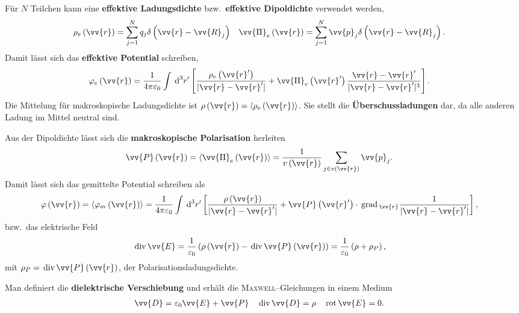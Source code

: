 \documentclass[a4paper,12pt]{article}
\newcommand{\td}{\,\text{d}}
\numberwithin{equation}{section}
\begin{document}
Für $N$ Teilchen kann eine \textbf{effektive Ladungsdichte} bzw.\ \textbf{effektive Dipoldichte} verwendet werden,
\begin{align} 
        \rho _e\left(\vv{r}\right)&=\sum_{j=1}^{N}q_j\delta \left(\vv{r}-\vv{R}_j\right)&\vv{\Pi }_e\left(\vv{r}\right)&=\sum_{j=1}^{N}\vv{p}_j\delta \left(\vv{r}-\vv{R}_j\right)
.\end{align} 
Damit lässt sich das \textbf{effektive Potential} schreiben,
\begin{align} 
        \varphi _e\left(\vv{r}\right)&=\dfrac{1}{4\pi \varepsilon _0}\int_{}^{}\td ^3r'\left[\dfrac{\rho _e\left(\vv{r}'\right)}{|\vv{r}-\vv{r}'|}+\vv{\Pi }_e\left(\vv{r}'\right)\dfrac{\vv{r}-\vv{r}'}{|\vv{r}-\vv{r}'|^3}\right]
.\end{align} 
Die Mittelung für makroskopische Ladungsdichte ist $\rho \left(\vv{r}\right)=\left\langle \rho _e\left(\vv{r}\right)\right\rangle $.
Sie stellt die \textbf{Überschussladungen} dar, da alle anderen Ladung im Mittel neutral sind.\par
Aus der Dipoldichte lässt sich die \textbf{makroskopische Polarisation} herleiten
\begin{align} 
        \vv{P}\left(\vv{r}\right)&=\left\langle \vv{\Pi }_e\left(\vv{r}\right)\right\rangle =\dfrac{1}{v\left(\vv{r}\right)}\sum\limits_{j \in v\left(\vv{r}\right)}^{}\vv{p}_j
.\end{align} 
Damit lässt sich das gemittelte Potential schreiben als
\begin{align} 
        \varphi \left(\vv{r}\right)=\left\langle \varphi _m\left(\vv{r}\right)\right\rangle &=\dfrac{1}{4\pi \varepsilon _0}\int_{}^{}\td ^3r'\left[\dfrac{\rho \left(\vv{r}\right)}{|\vv{r}-\vv{r}'|}+\vv{P}\left(\vv{r}'\right)\cdot \,\text{grad}\,_{\vv{r}}\dfrac{1}{|\vv{r}-\vv{r}'|}\right]
,\end{align} 
bzw.\ das elektrische Feld
\begin{align} 
        \,\text{div}\,\vv{E}&=\dfrac{1}{\varepsilon _0}\left(\rho \left(\vv{r}\right)-\,\text{div}\,\vv{P}\left(\vv{r}\right)\right)=\dfrac{1}{\varepsilon _0}\left(\rho +\rho _P\right)
,\end{align} 
mit $\rho _P=\,\text{div}\,\vv{P}\left(\vv{r}\right)$, der Polarisationsladungsdichte.\par
Man definiert die \textbf{dielektrische Verschiebung} und erhält die \textsc{Maxwell}--Gleichungen in einem Medium
\begin{align} 
        \vv{D}&=\varepsilon _0\vv{E}+\vv{P}&\,\text{div}\,\vv{D}&=\rho &\,\text{rot}\,\vv{E}&=0
.\end{align} 
\end{document}
